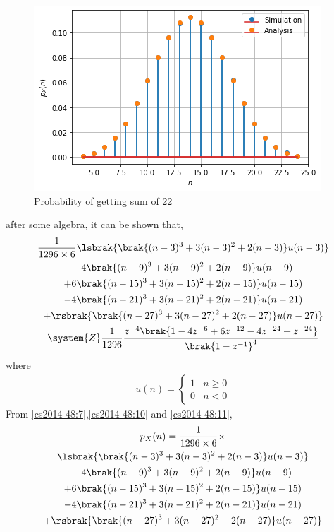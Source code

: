 \begin{figure}[htp]
    \centering
    \includegraphics[width=\columnwidth]{solutions/cs/2014/48/figures/assignment4.png}
    \caption{Probability of getting sum of 22}
\end{figure}
after some algebra, it can be shown that,
\begin{multline}
\frac{1}{1296\times 6}\lsbrak{\brak{(n-3)^3+3(n-3)^2+2(n-3)}u(n-3)} \\- 4\brak{(n-9)^3+3(n-9)^2+2(n-9)}u(n-9)\\+6\brak{(n-15)^3+3(n-15)^2+2(n-15)}u(n-15)\\-4\brak{(n-21)^3+3(n-21)^2+2(n-21)}u(n-21)\\+\rsbrak{\brak{(n-27)^3+3(n-27)^2+2(n-27)}u(n-27)}
\\
\system{Z}
\frac{1}{1296}\frac{z^{-4}\brak{1-4z^{-6}+6z^{-12}-4z^{-24}+z^{-24}}}{\brak{1-z^{-1}}^4}
\label{cs2014-48:11}
\end{multline}
where 
\begin{align}
u(n) =
\begin{cases}
1 & n \ge 0
\\
0 & n < 0\label{cs2014-48:13}
\end{cases}
\end{align}
From \eqref{cs2014-48:7},\eqref{cs2014-48:10} and \eqref{cs2014-48:11},
\begin{multline}
p_{X}(n) = \frac{1}{1296\times 6}\times\\\lsbrak{\brak{(n-3)^3+3(n-3)^2+2(n-3)}u(n-3)} \\- 4\brak{(n-9)^3+3(n-9)^2+2(n-9)}u(n-9)\\+6\brak{(n-15)^3+3(n-15)^2+2(n-15)}u(n-15)\\-4\brak{(n-21)^3+3(n-21)^2+2(n-21)}u(n-21)\\+\rsbrak{\brak{(n-27)^3+3(n-27)^2+2(n-27)}u(n-27)}
\label{cs2014-48:12}
\end{multline}

